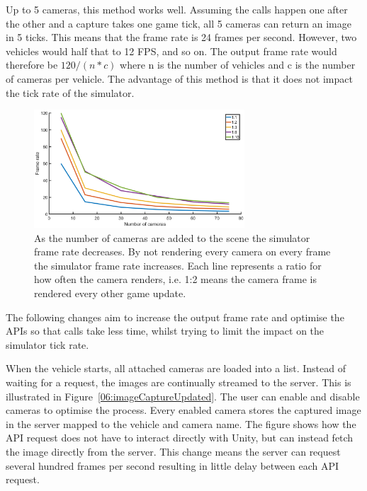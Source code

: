 Up to 5 cameras, this method works well. Assuming the calls happen one after the other and a capture takes one game tick, all 5 cameras can return an image in 5 ticks. This means that the frame rate is 24 frames per second. However, two vehicles would half that to 12 FPS, and so on. The output frame rate would therefore be $120/(n*c)$ where n is the number of vehicles and c is the number of cameras per vehicle. The advantage of this method is that it does not impact the tick rate of the simulator. 

\begin{figure}
    \includegraphics[width=0.7\textwidth]{06_Implementation/00_AirSim/Diagrams/frameRates.png}
    \caption{As the number of cameras are added to the scene the simulator frame rate decreases. By not rendering every camera on every frame the simulator frame rate increases. Each line represents a ratio for how often the camera renders, i.e. 1:2 means the camera frame is rendered every other game update.} \label{06:frameRates}
\end{figure}
The following changes aim to increase the output frame rate and optimise the APIs so that calls take less time, whilst trying to limit the impact on the simulator tick rate. 

When the vehicle starts, all attached cameras are loaded into a list. Instead of waiting for a request, the images are continually streamed to the server. This is illustrated in Figure~\ref{06:imageCaptureUpdated}. The user can enable and disable cameras to optimise the process. Every enabled camera stores the captured image in the server mapped to the vehicle and camera name. The figure shows how the API request does not have to interact directly with Unity, but can instead fetch the image directly from the server. This change means the server can request several hundred frames per second resulting in little delay between each API request. 

